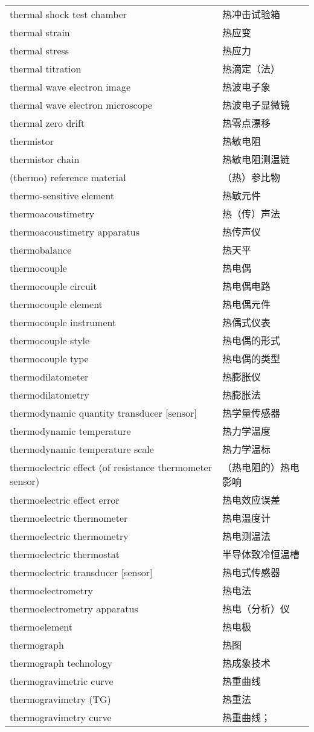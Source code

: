 \documentclass[
]{article}
\begin{document}
\begin{longtable}[]{@{}ll@{}}
thermal shock test chamber & 热冲击试验箱 \\
thermal strain & 热应变 \\
thermal stress & 热应力 \\
thermal titration & 热滴定（法） \\
thermal wave electron image & 热波电子象 \\
thermal wave electron microscope & 热波电子显微镜 \\
thermal zero drift & 热零点漂移 \\
thermistor & 热敏电阻 \\
thermistor chain & 热敏电阻测温链 \\
(thermo) reference material & （热）参比物 \\
thermo-sensitive element & 热敏元件 \\
thermoacoustimetry & 热（传）声法 \\
thermoacoustimetry apparatus & 热传声仪 \\
thermobalance & 热天平 \\
thermocouple & 热电偶 \\
thermocouple circuit & 热电偶电路 \\
thermocouple element & 热电偶元件 \\
thermocouple instrument & 热偶式仪表 \\
thermocouple style & 热电偶的形式 \\
thermocouple type & 热电偶的类型 \\
thermodilatometer & 热膨胀仪 \\
thermodilatometry & 热膨胀法 \\
thermodynamic quantity transducer {[}sensor{]} & 热学量传感器 \\
thermodynamic temperature & 热力学温度 \\
thermodynamic temperature scale & 热力学温标 \\
thermoelectric effect (of resistance thermometer sensor) &
（热电阻的）热电影响 \\
thermoelectric effect error & 热电效应误差 \\
thermoelectric thermometer & 热电温度计 \\
thermoelectric thermometry & 热电测温法 \\
thermoelectric thermostat & 半导体致冷恒温槽 \\
thermoelectric transducer {[}sensor{]} & 热电式传感器 \\
thermoelectrometry & 热电法 \\
thermoelectrometry apparatus & 热电（分析）仪 \\
thermoelement & 热电极 \\
thermograph & 热图 \\
thermograph technology & 热成象技术 \\
thermogravimetric curve & 热重曲线 \\
thermogravimetry (TG) & 热重法 \\
thermogravimetry curve & 热重曲线； \\
\bottomrule()
\end{longtable}
\end{document}
